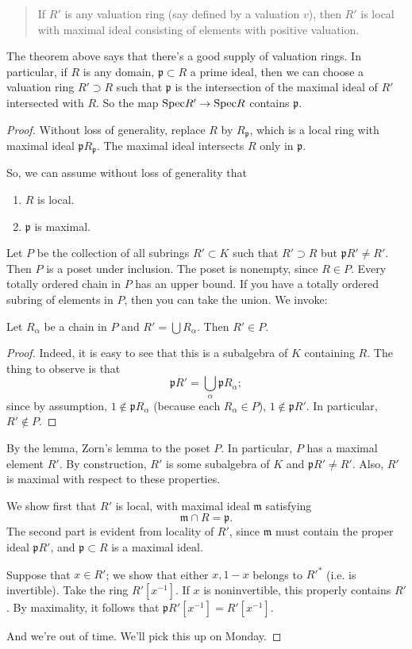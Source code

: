 \begin{quote}
If $R'$ is any valuation ring (say defined by a valuation $v$), then $R'$ is
local with maximal ideal consisting of elements with positive valuation. 
\end{quote}

The theorem above says that there's a good supply of valuation rings.
In particular, if $R$ is any domain, $\mathfrak{p} \subset R$ a prime ideal,
then we can choose a valuation ring $R' \supset R$ such that $\mathfrak{p}$ is
the intersection of the maximal ideal of $R'$ intersected with $R$.
So the map $\mathrm{Spec} R' \to \mathrm{Spec} R$ contains $\mathfrak{p}$.

\begin{proof} 
Without loss of generality, replace $R$ by $R_{\mathfrak{p}}$, which is a local
ring with maximal ideal $\mathfrak{p}R_{\mathfrak{p}}$. The maximal ideal
intersects $R$ only in $\mathfrak{p}$.

So, we can assume without loss of generality that 
\begin{enumerate}
\item $R$ is local. 
\item $\mathfrak{p}$ is maximal.
\end{enumerate}

Let $P$ be the collection of all subrings $R' \subset K$ such that $R' \supset
R$ but $\mathfrak{p}R' \neq R'$.  Then $P$ is a poset under inclusion. The
poset is nonempty, since $R \in P$.  Every totally ordered chain in $P$ has an
upper bound.  If you have a totally ordered subring of elements in $P$, then
you can take the union.  
We invoke:
\begin{lemma} 
Let $R_\alpha$ be a chain in $P$ and $R' = \bigcup R_\alpha$. Then $R' \in P$.
\end{lemma} 
\begin{proof} 
Indeed, it is easy to see that this is a subalgebra of $K$ containing $R$. The
thing to observe is that 
\[ \mathfrak{p}R' = \bigcup_\alpha \mathfrak{p} R_\alpha  ;\]
since by assumption, $1 \notin \mathfrak{p}R_\alpha$ (because each $R_\alpha
\in P$), $1 \notin \mathfrak{p}R'$. In particular, $R' \notin P$.
\end{proof} 

By the lemma, Zorn's lemma to the poset $P$. In particular, $P$ has a maximal
element $R'$. By construction, $R'$ is some subalgebra of $K$ and
$\mathfrak{p}R' \neq R'$. Also, $R'$ is maximal with respect to these
properties.

We show first that $R'$ is local, with maximal ideal $\mathfrak{m}$ satisfying
\[ \mathfrak{m} \cap R = \mathfrak{p}.  \]
The second part is evident from locality of $R'$, since $\mathfrak{m} $ must contain
the proper ideal $\mathfrak{p}R'$, and $\mathfrak{p} \subset R$ is a maximal
ideal. 

Suppose that $x \in R'$; we show that either $x, 1-x$ belongs to $R'^*$ (i.e.
is invertible). Take the ring $R'[x^{-1}]$.  If $x$ is noninvertible, this
properly contains $R'$.  By maximality, it follows that $\mathfrak{p}R'[x^{-1}]
= R'[x^{-1}]$. 

And we're out of time. We'll pick this up on Monday. 

\end{proof} 

